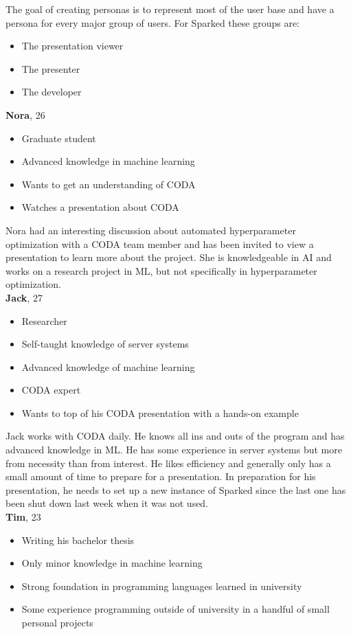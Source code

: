 The goal of creating personas is to represent most of the user base and have a persona for every major group of users. For Sparked these groups are:

\begin{itemize}
\item	The presentation viewer
\item The presenter
\item The developer
\end{itemize}

\noindent
\textbf{Nora}, 26
\begin{itemize}
\item	Graduate student
\item	Advanced knowledge in machine learning
\item	Wants to get an understanding of CODA
\item	Watches a presentation about CODA
\end{itemize}
Nora had an interesting discussion about automated hyperparameter optimization with a CODA team member and has been invited to view a presentation to learn more about the project. She is knowledgeable in AI and works on a research project in ML, but not specifically in hyperparameter optimization. \\

\noindent
\textbf{Jack}, 27
\begin{itemize}
\item	Researcher
\item	Self-taught knowledge of server systems 
\item	Advanced knowledge of machine learning
\item	CODA expert
\item	Wants to top of his CODA presentation with a hands-on example
\end{itemize}

Jack works with CODA daily. He knows all ins and outs of the program and has advanced knowledge in ML. He has some experience in server systems but more from necessity than from interest. He likes efficiency and generally only has a small amount of time to prepare for a presentation. In preparation for his presentation, he needs to set up a new instance of Sparked since the last one has been shut down last week when it was not used.  \\

\noindent
\textbf{Tim}, 23
\begin{itemize}
\item	Writing his bachelor thesis
\item	Only minor knowledge in machine learning
\item	Strong foundation in programming languages learned in university
\item	Some experience programming outside of university in a handful of small personal projects
\end{itemize}

